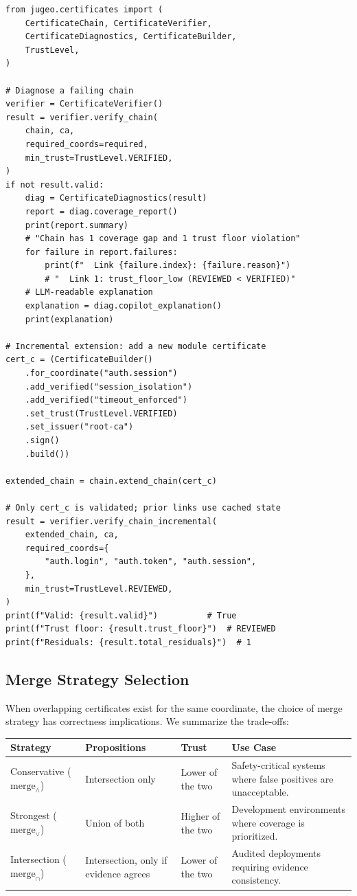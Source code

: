\documentclass[11pt]{article}
\renewcommand{\merge}{\mathrm{merge}}            %
\begin{document}
\begin{lstlisting}[style=jugeo-python, caption={Diagnostic reporting and incremental chain extension.}]
from jugeo.certificates import (
    CertificateChain, CertificateVerifier,
    CertificateDiagnostics, CertificateBuilder,
    TrustLevel,
)

# Diagnose a failing chain
verifier = CertificateVerifier()
result = verifier.verify_chain(
    chain, ca,
    required_coords=required,
    min_trust=TrustLevel.VERIFIED,
)
if not result.valid:
    diag = CertificateDiagnostics(result)
    report = diag.coverage_report()
    print(report.summary)
    # "Chain has 1 coverage gap and 1 trust floor violation"
    for failure in report.failures:
        print(f"  Link {failure.index}: {failure.reason}")
        # "  Link 1: trust_floor_low (REVIEWED < VERIFIED)"
    # LLM-readable explanation
    explanation = diag.copilot_explanation()
    print(explanation)

# Incremental extension: add a new module certificate
cert_c = (CertificateBuilder()
    .for_coordinate("auth.session")
    .add_verified("session_isolation")
    .add_verified("timeout_enforced")
    .set_trust(TrustLevel.VERIFIED)
    .set_issuer("root-ca")
    .sign()
    .build())

extended_chain = chain.extend_chain(cert_c)

# Only cert_c is validated; prior links use cached state
result = verifier.verify_chain_incremental(
    extended_chain, ca,
    required_coords={
        "auth.login", "auth.token", "auth.session",
    },
    min_trust=TrustLevel.REVIEWED,
)
print(f"Valid: {result.valid}")          # True
print(f"Trust floor: {result.trust_floor}")  # REVIEWED
print(f"Residuals: {result.total_residuals}")  # 1
\end{lstlisting}

\subsection{Merge Strategy Selection}\label{sec:merge-selection}

When overlapping certificates exist for the same coordinate, the choice
of merge strategy has correctness implications.  We summarize the
trade-offs:

\begin{center}
\begin{tabular}{lp{3.5cm}p{3.5cm}p{3.5cm}}
\toprule
\textbf{Strategy} & \textbf{Propositions} & \textbf{Trust} & \textbf{Use Case} \\
\midrule
Conservative ($\merge_{\wedge}$) &
  Intersection only &
  Lower of the two &
  Safety-critical systems where false positives are unacceptable. \\
Strongest ($\merge_{\vee}$) &
  Union of both &
  Higher of the two &
  Development environments where coverage is prioritized. \\
Intersection ($\merge_{\cap}$) &
  Intersection, only if evidence agrees &
  Lower of the two &
  Audited deployments requiring evidence consistency. \\
\bottomrule
\end{tabular}
\end{center}
\end{document}
